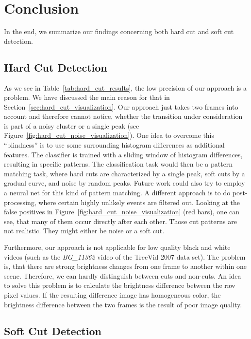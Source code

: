 \section{Conclusion}
\label{sec:conclusion}
In the end, we summarize our findings concerning both hard cut and soft cut detection.

\subsection{Hard Cut Detection}
\label{sec:conclusion_hard_cut}

As we see in Table~\ref{tab:hard_cut_results}, the low precision of our approach is a problem.
We have discussed the main reason for that in Section~\ref{sec:hard_cut_visualization}.
Our approach just takes two frames into account and therefore cannot notice, whether the transition under consideration is part of a noisy cluster or a single peak (see Figure~\ref{fig:hard_cut_noise_visualization}).
One idea to overcome this ``blindness'' is to use some surrounding histogram differences as additional features.
The classifier is trained with a sliding window of histogram differences, resulting in specific patterns.
The classification task would then be a pattern matching task, where hard cuts are characterized by a single peak, soft cuts by a gradual curve, and noise by random peaks.
Future work could also try to employ a neural net for this kind of pattern matching.
A different approach is to do post-processing, where certain highly unlikely events are filtered out.
Looking at the false positives in Figure~\ref{fig:hard_cut_noise_visualization} (red bars), one can see, that many of them occur directly after each other.
Those cut patterns are not realistic.
They might either be noise or a soft cut.

Furthermore, our approach is not applicable for low quality black and white videos (such as the \emph{BG\_11362} video of the TrecVid 2007 data set).
The problem is, that there are strong brightness changes from one frame to another within one scene.
Therefore, we can hardly distinguish between cuts and non-cuts.
An idea to solve this problem is to calculate the brightness difference between the raw pixel values.
If the resulting difference image has homogeneous color, the brightness difference between the two frames is the result of poor image quality.


\subsection{Soft Cut Detection}
\label{sec:conclusion_hard_cut}

